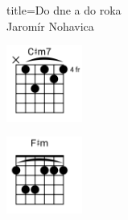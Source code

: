 \begin{song}{title=\predtitle\centering Do dne a do roka \\ \large Jaromír Nohavica \vspace*{-0.3cm}}
\begin{centerjustified}
\begin{varwidth}{0.35\textwidth}
	\includegraphics[width=2.5cm]{../Akordy/cxm7.png}
	
	\includegraphics[width=2.5cm]{../Akordy/fxm.png}
\end{varwidth}

\end{centerjustified}
\setcounter{Slokočet}{0}
\end{song}
